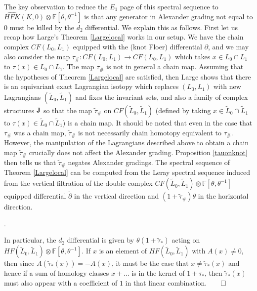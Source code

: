 \documentclass[11pt]{amsart}
\theoremstyle{definition}
\theoremstyle{remark}
\def\F{\mathbb{F}}
\def\HFK {\mathit{HFK}}
\newcommand\HFKhat{\widehat{\HFK}}
\numberwithin{equation}{section}
\begin{document}
The key observation to reduce the $E_1$ page of this spectral sequence to $\HFKhat(K,0)\otimes \F[\theta,\theta^{-1}]$ is that any generator in Alexander grading not equal to $0$ must be killed by the $d_2$ differential. We explain this as follows. First let us recap how Large's Theorem \ref{Largelocal} works in our setup. We have the chain complex $CF(L_0,L_1)$ equipped with the (knot Floer) differential $\partial$, and we may also consider the map $\tau_\#\colon CF(L_0,L_1)\to CF(L_0,L_1)$ which takes $x\in L_0\cap L_1$ to $\tau(x)\in L_0\cap L_1$. The map $\tau_\#$ is not in general a chain map. Assuming that the hypotheses of Theorem \ref{Largelocal} are satisfied, then Large shows that there is an equivariant exact Lagrangian isotopy which replaces $(L_0,L_1)$ with new Lagrangians $(\widetilde{L}_0,\widetilde{L}_1)$ and fixes the invariant sets, and also a family of complex structures $\bf{J}$ so that the map $\widetilde{\tau}_\#$ on $CF(\widetilde{L}_0,\widetilde{L}_1)$ (defined by taking $x\in \widetilde{L}_0\cap\widetilde{L}_1$ to $\tau(x)\in \widetilde{L}_0\cap\widetilde{L}_1$) is a chain map. It should be noted that even in the case that $\tau_\#$ was a chain map, $\widetilde{\tau}_\#$ is not necessarily chain homotopy equivalent to $\tau_\#$. However, the manipulation of the Lagrangians described above to obtain a chain map $\widetilde{\tau}_\#$ crucially does not affect the Alexander grading. Proposition \ref{tauonknot} then tells us that $\widetilde{\tau}_\#$ negates Alexander gradings.
 The spectral sequence of Theorem \ref{Largelocal} can be computed from the Leray spectral sequence induced from the vertical filtration of the double complex $CF(\widetilde{L}_0,\widetilde{L}_1)\otimes \F[\theta,\theta^{-1}]$ equipped  differential $\widetilde{\partial}$ in the vertical direction and $(1+\widetilde{\tau}_\#)\theta$ in the horizontal direction. 
 \begin{center}
.
\end{center}
In particular, the $d_2$ differential is given by $\theta(1+\widetilde{\tau}_*)$ acting on $HF(\widetilde{L}_0,\widetilde{L}_1)\otimes \F[\theta,\theta^{-1}]$. If $x$ is an element of $HF(\widetilde{L}_0,\widetilde{L}_1)$ with $A(x)\neq 0$, then since $A(\widetilde{\tau}_*(x))=-A(x)$, it must be the case that $x\neq \widetilde{\tau}_*(x)$ and hence if a sum of homology classes $x+\hdots $ is in the kernel of $1+\tau_*$, then $\widetilde{\tau}_*(x)$ must also appear with a coefficient of $1$ in that linear combination.$\qed$\\
\end{document}
